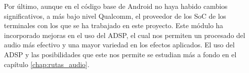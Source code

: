 Por último, aunque en el código base de Android no haya habido cambios significativos, a más bajo nivel Qualcomm, el proveedor de los \gls{SoC} de los terminales con los que se ha trabajado en este proyecto. Este módulo ha incorporado mejoras en el uso del \gls{ADSP}, el cual nos permiten un procesado del audio más efectivo y una mayor variedad en los efectos aplicados. El uso del \gls{ADSP} y las posibilidades que este nos permite se estudian más a fondo en el capítulo \ref{chap:rutas_audio}.